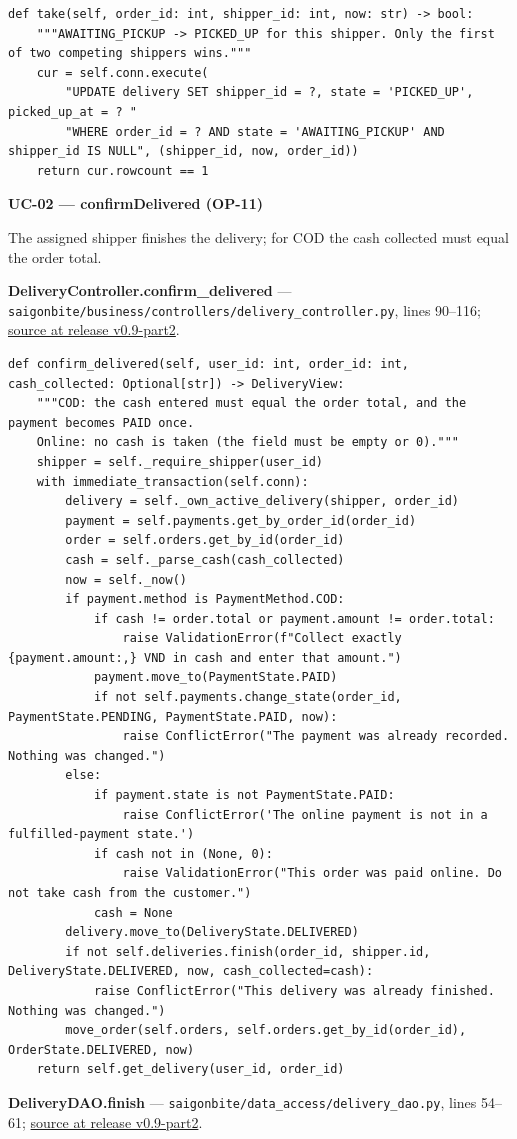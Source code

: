 \begin{lstlisting}
def take(self, order_id: int, shipper_id: int, now: str) -> bool:
    """AWAITING_PICKUP -> PICKED_UP for this shipper. Only the first of two competing shippers wins."""
    cur = self.conn.execute(
        "UPDATE delivery SET shipper_id = ?, state = 'PICKED_UP', picked_up_at = ? "
        "WHERE order_id = ? AND state = 'AWAITING_PICKUP' AND shipper_id IS NULL", (shipper_id, now, order_id))
    return cur.rowcount == 1
\end{lstlisting}
\textbf{UC-02 --- confirmDelivered (OP-11)}

The assigned shipper finishes the delivery; for COD the cash collected must equal the order total.

\textbf{DeliveryController.confirm\_delivered} --- \texttt{saigonbite/\allowbreak{}business/\allowbreak{}controllers/\allowbreak{}delivery\_\allowbreak{}controller.\allowbreak{}py}, lines 90--116; \href{\TargetRepo\detokenize{/blob/v0.9-part2/saigonbite/business/controllers/delivery_controller.py#L90-L116}}{source at release v0.9-part2}.

\begin{lstlisting}
def confirm_delivered(self, user_id: int, order_id: int, cash_collected: Optional[str]) -> DeliveryView:
    """COD: the cash entered must equal the order total, and the payment becomes PAID once.
    Online: no cash is taken (the field must be empty or 0)."""
    shipper = self._require_shipper(user_id)
    with immediate_transaction(self.conn):
        delivery = self._own_active_delivery(shipper, order_id)
        payment = self.payments.get_by_order_id(order_id)
        order = self.orders.get_by_id(order_id)
        cash = self._parse_cash(cash_collected)
        now = self._now()
        if payment.method is PaymentMethod.COD:
            if cash != order.total or payment.amount != order.total:
                raise ValidationError(f"Collect exactly {payment.amount:,} VND in cash and enter that amount.")
            payment.move_to(PaymentState.PAID)
            if not self.payments.change_state(order_id, PaymentState.PENDING, PaymentState.PAID, now):
                raise ConflictError("The payment was already recorded. Nothing was changed.")
        else:
            if payment.state is not PaymentState.PAID:
                raise ConflictError('The online payment is not in a fulfilled-payment state.')
            if cash not in (None, 0):
                raise ValidationError("This order was paid online. Do not take cash from the customer.")
            cash = None
        delivery.move_to(DeliveryState.DELIVERED)
        if not self.deliveries.finish(order_id, shipper.id, DeliveryState.DELIVERED, now, cash_collected=cash):
            raise ConflictError("This delivery was already finished. Nothing was changed.")
        move_order(self.orders, self.orders.get_by_id(order_id), OrderState.DELIVERED, now)
    return self.get_delivery(user_id, order_id)
\end{lstlisting}
\textbf{DeliveryDAO.finish} --- \texttt{saigonbite/\allowbreak{}data\_\allowbreak{}access/\allowbreak{}delivery\_\allowbreak{}dao.\allowbreak{}py}, lines 54--61; \href{\TargetRepo\detokenize{/blob/v0.9-part2/saigonbite/data_access/delivery_dao.py#L54-L61}}{source at release v0.9-part2}.

